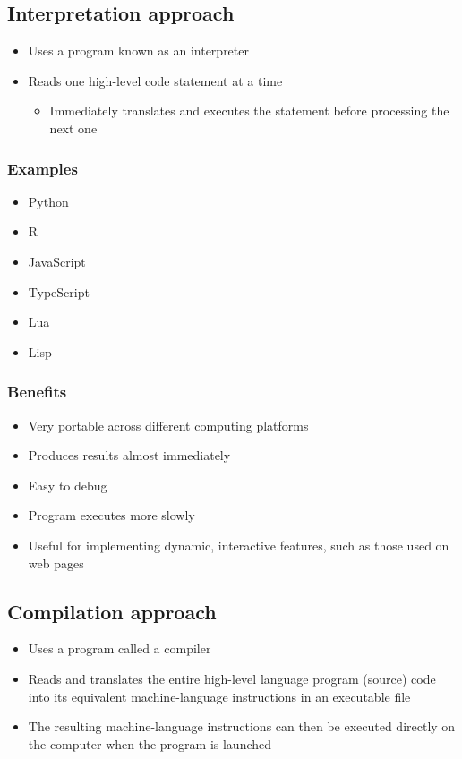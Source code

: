 \documentclass[11pt]{article}
\begin{document}
\subsection{Interpretation approach}
\label{sec:orgdc6ea74}
\begin{itemize}
\item Uses a program known as an interpreter
\item Reads one high-level code statement at a time
\begin{itemize}
\item Immediately translates and executes the statement before processing the next one
\end{itemize}
\end{itemize}

\subsubsection{Examples}
\label{sec:org2b9f911}
\begin{itemize}
\item Python
\item R
\item JavaScript
\item TypeScript
\item Lua
\item Lisp
\end{itemize}

\subsubsection{Benefits}
\label{sec:org76a4d44}
\begin{itemize}
\item Very portable across different computing platforms
\item Produces results almost immediately
\item Easy to debug
\item Program executes more slowly
\item Useful for implementing dynamic, interactive features, such as those used on web pages
\end{itemize}

 \newpage

\subsection{Compilation approach}
\label{sec:org0a9645a}
\begin{itemize}
\item Uses a program called a compiler
\item Reads and translates the entire high-level language program (source) code into its equivalent machine-language instructions in an executable file
\item The resulting machine-language instructions can then be executed directly on the computer when the program is launched
\end{itemize}
\end{document}
